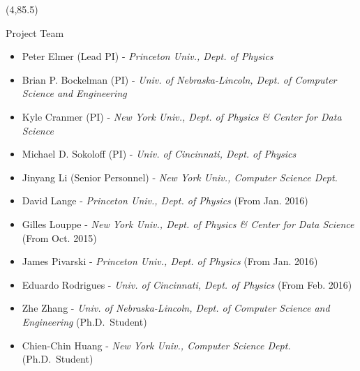 \documentclass[final]{beamer}
\begin{document}
\begin{frame}{}
\begin{textblock}{38.0}(4,85.5)
\begin{block}{Project Team}
\begin{itemize}
\item Peter Elmer (Lead PI) - {\it Princeton Univ., Dept. of Physics}
\item Brian P. Bockelman (PI) - {\it Univ. of Nebraska-Lincoln, Dept. of Computer Science and Engineering}
\item Kyle Cranmer (PI) - {\it New York Univ., Dept. of Physics \& Center for Data Science}
\item Michael D. Sokoloff (PI) - {\it Univ. of Cincinnati, Dept. of Physics}
\item Jinyang Li (Senior Personnel) - {\it New York Univ., Computer Science Dept.}
\item David Lange - {\it Princeton Univ., Dept. of Physics} (From Jan. 2016)
\item Gilles Louppe - {\it New York Univ., Dept. of Physics \& Center for Data Science} (From Oct. 2015)
\item James Pivarski - {\it Princeton Univ., Dept. of Physics} (From Jan. 2016)
\item Eduardo Rodrigues - {\it Univ. of Cincinnati, Dept. of Physics} (From Feb. 2016)
\item Zhe Zhang - {\it Univ. of Nebraska-Lincoln, Dept. of Computer Science and Engineering} (Ph.D.\ Student)
\item Chien-Chin Huang - {\it New York Univ., Computer Science Dept.} (Ph.D.\ Student) 
\end{itemize}
\end{block}
\end{textblock}




\end{frame}
\end{document}
